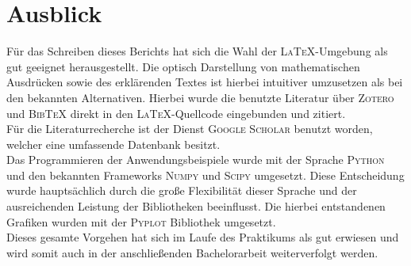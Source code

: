 \chapter{Ausblick}
Für das Schreiben dieses Berichts hat sich die Wahl der \textsc{LaTeX}-Umgebung als gut geeignet herausgestellt. Die optisch Darstellung von mathematischen Ausdrücken sowie des erklärenden Textes ist hierbei intuitiver umzusetzen als bei den bekannten Alternativen. Hierbei wurde die benutzte Literatur über \textsc{Zotero} und \textsc{BibTeX} direkt in den \textsc{LaTeX}-Quellcode eingebunden und zitiert.\\
Für die Literaturrecherche ist der Dienst \textsc{Google Scholar} benutzt worden, welcher eine umfassende Datenbank besitzt.\\

Das Programmieren der Anwendungsbeispiele wurde mit der Sprache \textsc{Python} und den bekannten Frameworks \textsc{Numpy} und \textsc{Scipy} umgesetzt. Diese Entscheidung wurde hauptsächlich durch die große Flexibilität dieser Sprache und der ausreichenden Leistung der Bibliotheken beeinflusst. Die hierbei entstandenen Grafiken wurden mit der \textsc{Pyplot} Bibliothek umgesetzt.\\ 

Dieses gesamte Vorgehen hat sich im Laufe des Praktikums als gut erwiesen und wird somit auch in der anschließenden Bachelorarbeit weiterverfolgt werden.